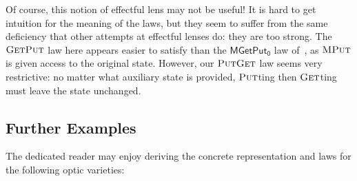 \documentclass[11pt,letterpaper]{article}
\theoremstyle{plain}
\theoremstyle{definition}
\newcommand{\C}{\mathscr{C}}
\newcommand{\homC}{\underline{\C}}
\newcommand{\fget}{\textsc{Get}}
\newcommand{\fput}{\textsc{Put}}
\newcommand{\mput}{\textsc{MPut}}
\newcommand{\todo}[1]{\textcolor{red}{\small #1}}
\begin{document}

Of course, this notion of effectful lens may not be useful! It is hard to get intuition for the meaning of the laws, but they seem to suffer from the same deficiency that other attempts at effectful lenses do: they are too strong. The $\fget\fput$ law here appears easier to satisfy than the $\mathsf{MGetPut_0}$ law of~\cite{ReflectionsOnMonadicLenses}, as $\mput$ is given access to the original state. However, our $\fput\fget$ law seems very restrictive: no matter what auxiliary state is provided, $\fput$ting then $\fget$ting must leave the state unchanged.

\subsection{Further Examples}
The dedicated reader may enjoy deriving the concrete representation and laws for the following optic varieties:
\end{document}
